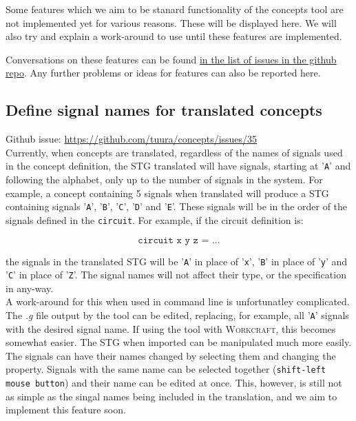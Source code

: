 \documentclass{proc}
\newcommand{\noun}[1]{\textsc{#1}}
\begin{document}
Some features which we aim to be stanard functionality of the concepts tool are not implemented yet for various reasons. 
These will be displayed here. We will also try and explain a work-around to use until these features are implemented.

Conversations on these features can be found \href{https://github.com/tuura/concepts/issues}{in the list of issues in the github repo}. 
Any further problems or ideas for features can also be reported here.

\subsection*{Define signal names for translated concepts}

Github issue: \url{https://github.com/tuura/concepts/issues/35}\\

Currently, when concepts are translated, regardless of the names of signals used in the concept definition, the STG translated will have signals, starting at '\texttt{A}' and following the 
alphabet, only up to the number of signals in the system. For example, a concept containing 5 signals when translated will produce a STG containing signals '\texttt{A}', '\texttt{B}', 
'\texttt{C}', '\texttt{D}' and '\texttt{E}'. These signals will be in the order of the signals defined in the \texttt{circuit}. For example, if the circuit definition is:

  \[
  \texttt{circuit x y z = ...}
  \]

the signals in the translated STG will be '\texttt{A}' in place of '\texttt{x}', '\texttt{B}' in place of '\texttt{y}' and '\texttt{C}' in place of '\texttt{Z}'.  
The signal names will not affect their type, or the specification in any-way. \\

A work-around for this when used in command line is unfortunatley complicated. 
The \emph{.g} file output by the tool can be edited, replacing, for example, all '\texttt{A}' signals with the desired signal name.
If using the tool with \noun{Workcraft}, this becomes somewhat easier. The STG when imported can be manipulated much more easily. 
The signals can have their names changed by selecting them and changing the property. 
Signals with the same name can be selected together (\texttt{shift-left mouse button}) and their name can be edited at once. 
This, however, is still not as simple as the singal names being included in the translation, and we aim to implement this feature soon. 
\end{document}
